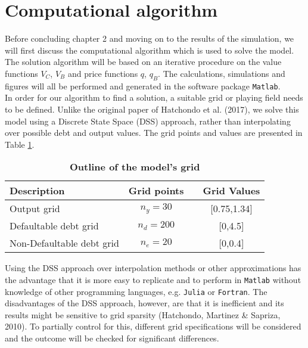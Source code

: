\section{Computational algorithm}
Before concluding chapter 2 and moving on to the results of the simulation, we will first discuss the computational algorithm which is used to solve the model. The solution algorithm will be based on an iterative procedure on the value functions $V_C$, $V_B$ and price functions $q$, $q_B$. The calculations, simulations and figures will all be performed and generated in the software package \texttt{Matlab}.\\

In order for our algorithm to find a solution, a suitable grid or playing field needs to be defined. Unlike the original paper of Hatchondo et al. (2017), we solve this model using a Discrete State Space (DSS) approach, rather than interpolating over possible debt and output values. The grid points and values are presented in Table \ref{tab:Grid}.\\ 
\begin{table}[h]
\setlength{\arrayrulewidth}{0.3mm}
\centering
    \caption{\textbf{Outline of the model's grid}\label{tab:Grid}}
    \vspace{1mm}
 \begin{tabular}{lccc} 
\hline\hline
\textbf {Description}                &  \textbf {Grid points}       &&  \textbf {Grid Values}   \\[1ex] 
\hline\hline
Output grid                          & $n_y = 30$                   && [0.75,1.34]              \\[1ex]
Defaultable debt grid                & $n_d = 200$                  && [0,4.5]                  \\[1ex]
Non-Defaultable debt grid            & $n_e= 20$                    && [0,0.4]                  \\[1ex]
\hline\hline
\end{tabular}
\end{table}

Using the DSS approach over interpolation methods or other approximations has the advantage that it is more easy to replicate and to perform in \texttt{Matlab} without knowledge of other programming languages, e.g. \texttt{Julia} or \texttt{Fortran}. The disadvantages of the DSS approach, however, are that it is inefficient and its results might be sensitive to grid sparsity (Hatchondo, Martinez \& Sapriza, 2010). To partially control for this, different grid specifications will be considered and the outcome will be checked for significant differences.\\

